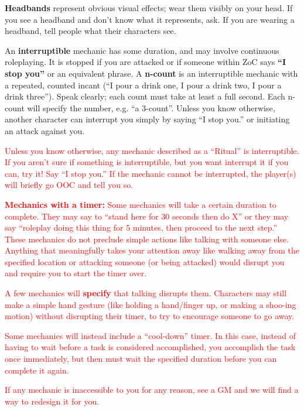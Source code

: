 \documentclass[sheet]{GL2020}
\begin{document}
{\bf Headbands} represent obvious visual effects; wear them visibly on your head. If you see a headband and don't know what it represents, ask. If you are wearing a headband, tell people what their characters see.

An {\bf interruptible} mechanic has some duration, and may involve continuous roleplaying.  It is stopped if you are attacked or if someone within ZoC says {\bf ``I stop you''} or an equivalent phrase. A {\bf n-count} is an interruptible mechanic with a repeated, counted incant (``I pour a drink one, I pour a drink two, I pour a drink three'').  Speak clearly; each count must take at least a full second. Each n-count will specify the number, e.g. ``a 3-count''. Unless you know otherwise, another character can interrupt you simply by saying ``I stop you.'' or initiating an attack against you.

\textcolor{red}{Unless you know otherwise, any mechanic described as a ``Ritual'' is interruptible. If you aren't sure if something is interruptible, but you want interrupt it if you can, try it! Say ``I stop you.'' If the mechanic cannot be interrupted, the player(s) will briefly go OOC and tell you so.}

\textcolor{red}{\textbf{Mechanics with a timer:} Some mechanics will take a certain duration to complete. They may say to ``stand here for 30 seconds then do X'' or they may say ``roleplay doing this thing for 5 minutes, then proceed to the next step.'' These mechanics do not preclude simple actions like talking with someone else. Anything that meaningfully takes your attention away like walking away from the specified location or attacking someone (or being attacked) would disrupt you and require you to start the timer over.}

\textcolor{red}{A few mechanics will \textbf{specify} that talking disrupts them. Characters may still make a simple hand gesture (like holding a hand/finger up, or making a shoo-ing motion) without disrupting their timer, to try to encourage someone to go away.}

\textcolor{red}{Some mechanics will instead include a ``cool-down'' timer. In this case, instead of having to wait before a task is considered accomplished, you accomplish the task once immediately, but then must wait the specified duration before you can complete it again. }

\textcolor{red}{If any mechanic is inaccessible to you for any reason, see a GM and we will find a way to redesign it for you.}
\end{document}
